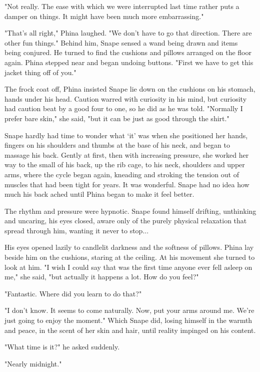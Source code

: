 "Not really. The ease with which we were interrupted last time rather puts a damper on things. It might have been much more embarrassing."

"That's all right," Phina laughed. "We don't have to go that direction. There are other fun things." Behind him, Snape sensed a wand being drawn and items being conjured. He turned to find the cushions and pillows arranged on the floor again. Phina stepped near and began undoing buttons. "First we have to get this jacket thing off of you."

The frock coat off, Phina insisted Snape lie down on the cushions on his stomach, hands under his head. Caution warred with curiosity in his mind, but curiosity had caution beat by a good four to one, so he did as he was told. "Normally I prefer bare skin," she said, "but it can be just as good through the shirt."

Snape hardly had time to wonder what `it' was when she positioned her hands, fingers on his shoulders and thumbs at the base of his neck, and began to massage his back. Gently at first, then with increasing pressure, she worked her way to the small of his back, up the rib cage, to his neck, shoulders and upper arms, where the cycle began again, kneading and stroking the tension out of muscles that had been tight for years. It was wonderful. Snape had no idea how much his back ached until Phina began to make it feel better.

The rhythm and pressure were hypnotic. Snape found himself drifting, unthinking and uncaring, his eyes closed, aware only of the purely physical relaxation that spread through him, wanting it never to stop...

His eyes opened lazily to candlelit darkness and the softness of pillows. Phina lay beside him on the cushions, staring at the ceiling. At his movement she turned to look at him. "I wish I could say that was the first time anyone ever fell asleep on me," she said, "but actually it happens a lot. How do you feel?"

"Fantastic. Where did you learn to do that?"

"I don't know. It seems to come naturally. Now, put your arms around me. We're just going to enjoy the moment." Which Snape did, losing himself in the warmth and peace, in the scent of her skin and hair, until reality impinged on his content.

"What time is it?" he asked suddenly.

"Nearly midnight."

